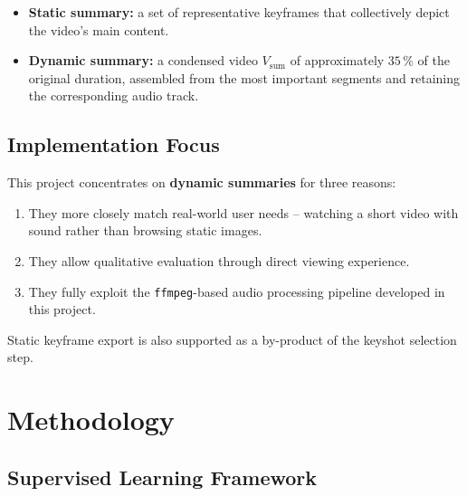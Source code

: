 \documentclass[12pt, a4paper]{report}
\begin{document}
\begin{itemize}[leftmargin=1.5cm]
  \item \textbf{Static summary:} a set of representative keyframes that collectively
        depict the video's main content.
  \item \textbf{Dynamic summary:} a condensed video $V_{\text{sum}}$ of approximately
        $35\,\%$ of the original duration, assembled from the most important segments
        and retaining the corresponding audio track.
\end{itemize}

\section{Implementation Focus}

This project concentrates on \textbf{dynamic summaries} for three reasons:
\begin{enumerate}[leftmargin=1.5cm]
  \item They more closely match real-world user needs -- watching a short video with
        sound rather than browsing static images.
  \item They allow qualitative evaluation through direct viewing experience.
  \item They fully exploit the \texttt{ffmpeg}-based audio processing pipeline
        developed in this project.
\end{enumerate}

Static keyframe export is also supported as a by-product of the keyshot selection step.

\chapter{Methodology}

\section{Supervised Learning Framework}
\end{document}

